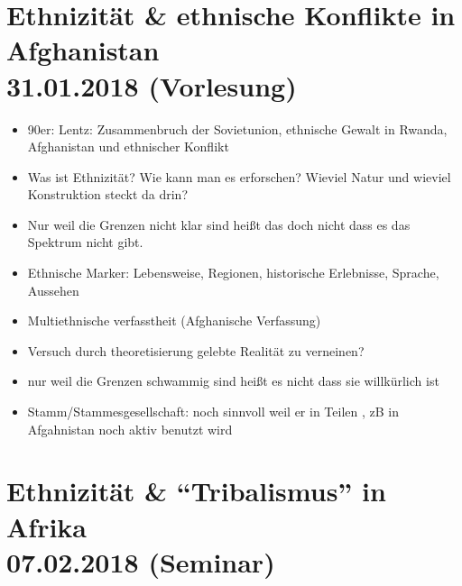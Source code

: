 \documentclass[emulatestandardclasses]{scrartcl}
\begin{document}
\section{Ethnizität \& ethnische Konflikte in Afghanistan\\31.01.2018 (Vorlesung)}

\begin{itemize}
  \item 90er: Lentz: Zusammenbruch der Sovietunion, ethnische Gewalt in Rwanda, Afghanistan und ethnischer Konflikt
  \item Was ist Ethnizität? Wie kann man es erforschen? Wieviel Natur und wieviel Konstruktion steckt da drin?
  \item Nur weil die Grenzen nicht klar sind heißt das doch nicht dass es das Spektrum nicht gibt.
  \item Ethnische Marker: Lebensweise, Regionen, historische Erlebnisse, Sprache, Aussehen
  \item Multiethnische verfasstheit (Afghanische Verfassung)
  \item Versuch durch theoretisierung gelebte Realität zu verneinen?
  \item nur weil die Grenzen schwammig sind heißt es nicht dass sie willkürlich ist
  \item Stamm/Stammesgesellschaft: noch sinnvoll weil er in Teilen , zB in Afgahnistan noch aktiv benutzt wird
\end{itemize}


\section{Ethnizität \& "`Tribalismus"' in Afrika\\07.02.2018 (Seminar)}
\end{document}

